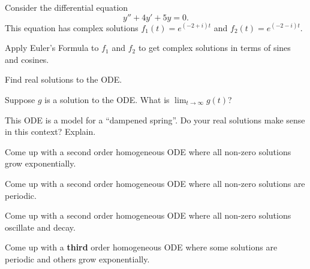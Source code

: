 \documentclass{workbook}
\begin{document}
\begin{slide}
	\question
	Consider the differential equation
	\[
		y''+4y'+5y=0.
	\]
	This equation has complex solutions $f_1(t)=e^{(-2+i)t}$
	and $f_2(t)=e^{(-2-i)t}$.

	\begin{parts}
		\item Apply Euler's Formula to $f_1$ and $f_2$ to get complex solutions in terms of sines and cosines.
		\item Find real solutions to the ODE.
		\item Suppose $g$ is a solution to the ODE. What is $\displaystyle 
		\lim_{t\to\infty} g(t)$?
		\item This ODE is a model for a ``dampened spring''. Do your
		real solutions make sense in this context? Explain.
	\end{parts}
\end{slide}


\begin{slide}
	\question

	\begin{parts}
		\item Come up with a second order homogeneous ODE where all non-zero solutions 	grow exponentially.
		\item Come up with a second order homogeneous ODE where all non-zero solutions are periodic.
		\item Come up with a second order homogeneous ODE where all non-zero solutions oscillate and decay.
		\item Come up with a \textbf{third} order homogeneous ODE where some solutions are periodic and others grow exponentially.
		
	\end{parts}
\end{slide}
\end{document}
